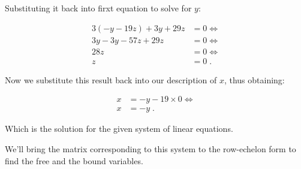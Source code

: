 \documentclass[11pt]{article}
\begin{document}
Substituting it back into firxt equation to solve for \(y\):

\begin{align*}
  3(-y - 19z) + 3y + 29z &= 0 \iff \\
  3y - 3y - 57z + 29z &= 0 \iff \\
  28z &= 0 \iff \\
  z &= 0\;.
\end{align*}

Now we substitute this result back into our description of \(x\), thus
obtaining:

\begin{align*}
x &= -y - 19 \times 0 \iff \\
x &= -y\;.
\end{align*}

Which is the solution for the given system of linear equations.

We'll bring the matrix corresponding to this system to the row-echelon form
to find the free and the bound variables.
\end{document}
